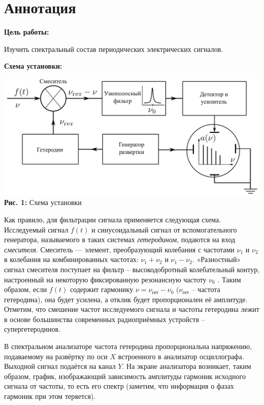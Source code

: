 \documentclass[12pt,a4paper]{scrartcl}
\begin{document}
	\section{Аннотация}
	
	\textbf{Цель работы: }
	
	Изучить спектральный состав периодических электрических сигналов.
	
	\textbf{Схема установки:}
	\begin{center}
		\includegraphics[scale=0.25]{PIC_1.png}
		\\\textbf{Рис. 1:} Схема установки
	\end{center}	
		
	Как правило, для фильтрации сигнала применяется следующая схема. Исследуемый сигнал $f(t)$ и синусоидальный сигнал от вспомогательного генератора, называемого в таких системах \textit{гетеродином}, подаются на вход \textit{смесителя}. Смеситель — элемент, преобразующий колебания с частотами $\nu_1$ и $\nu_2$ в колебания на комбинированных частотах: $\nu_1 + \nu_2$ и $\nu_1 - \nu_2$. «Разностный» сигнал смесителя поступает на фильтр -- высокодобротный колебательный контур, настроенный на некоторую фиксированную резонансную частоту $\nu_0$ . Таким образом, если $f(t)$ содержит гармонику $\nu = \nu_{\text{гет}} - \nu_0$ ($\nu_{\text{гет}}$ -- частота гетеродина), она будет	усилена, а отклик будет пропорционален её амплитуде. Отметим, что смешение частот исследуемого сигнала и частоты гетеродина лежит в основе большинства современных радиоприёмных устройств -- супергетеродинов.
	
	В спектральном анализаторе частота гетеродина пропорциональна напряжению, подаваемому на развёртку по оси $X$ встроенного в анализатор осциллографа. Выходной сигнал подаётся на канал $Y$. На экране анализатора возникает, таким образом, график, изображающий зависимость амплитуды гармоник исходного сигнала от частоты, то есть его спектр (заметим, что информация о фазах гармоник при этом теряется).
	
\end{document}
